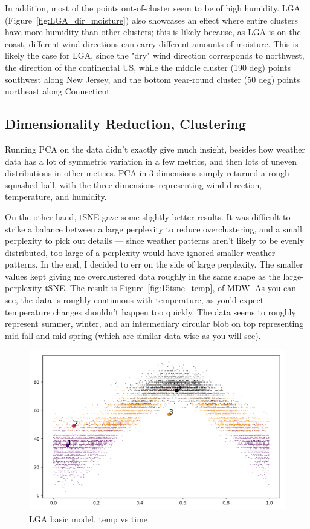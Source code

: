 \documentclass[a4paper]{article}
\begin{document}
In addition, most of the points out-of-cluster seem to be of high humidity. LGA (Figure~\ref{fig:LGA_dir_moisture}) also showcases an effect where entire clusters have more humidity than other clusters; this is likely because, as LGA is on the coast, different wind directions can carry different amounts of moisture. This is likely the case for LGA, since the "dry" wind direction corresponds to northwest, the direction of the continental US, while the middle cluster (190 deg) points southwest along New Jersey, and the bottom year-round cluster (50 deg) points northeast along Connecticut. 


\subsection{Dimensionality Reduction, Clustering}

Running PCA on the data didn't exactly give much insight, besides how weather data has a lot of symmetric variation in a few metrics, and then lots of uneven distributions in other metrics. PCA in 3 dimensions simply returned a rough squashed ball, with the three dimensions representing wind direction, temperature, and humidity. 

On the other hand, tSNE gave some slightly better results. It was difficult to strike a balance between a large perplexity to reduce overclustering, and a small perplexity to pick out details --- since weather patterns aren't likely to be evenly distributed, too large of a perplexity would have ignored smaller weather patterns. In the end, I decided to err on the side of large perplexity. The smaller values kept giving me overclustered data roughly in the same shape as the large-perplexity tSNE. The result is Figure~\ref{fig:15tsne_temp}, of MDW. As you can see, the data is roughly continuous with temperature, as you'd expect --- temperature changes shouldn't happen too quickly. The data seems to roughly represent summer, winter, and an intermediary circular blob on top representing mid-fall and mid-spring (which are similar data-wise as you will see). 


\begin{figure}[t]
  \centering
  \includegraphics[width=\linewidth]{../png/models/LGA-basic-temperature4.png}
  \caption{LGA basic model, temp vs time}
  \label{fig:LGA_basics}
\end{figure}
\end{document}
